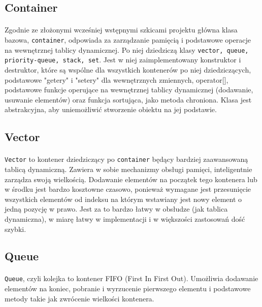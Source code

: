\documentclass{article}
\begin{document}
\subsection{Container}
\paragraph{}
Zgodnie ze złożonymi wcześniej wstępnymi szkicami projektu główna klasa bazowa, \texttt{container}, odpowiada za
zarządzanie pamięcią i podstawowe operacje na wewnętrznej tablicy dynamicznej. Po niej dziedziczą klasy \texttt{vector, queue,
priority-queue, stack, set}. Jest w niej zaimplementowany konstruktor \newline i destruktor, które są wspólne dla wszystkich
kontenerów po niej dziedziczących, podstawowe "getery" i "setery" dla wewnętrznych zmiennych, operator[],
podstawowe funkcje operujące na wewnętrznej tablicy dynamicznej (dodawanie, usuwanie elementów) oraz funkcja
sortująca, jako metoda chroniona. Klasa jest abstrakcyjna, aby uniemożliwić stworzenie obiektu na jej podstawie.

\subsection{Vector}
\paragraph{}
\texttt{Vector} to kontener dziedziczący po \texttt{container} będący bardziej zaawansowaną tablicą dynamiczną.
Zawiera w sobie mechanizmy obsługi pamięci, inteligentnie zarządza swoją wielkością. Dodawanie elementów
na początek tego kontenera lub w środku jest bardzo kosztowne czasowo, ponieważ wymagane jest przesunięcie
wszystkich elementów od indeksu na którym wstawiany jest nowy element o jedną pozycję w prawo. Jest za to bardzo
łatwy w obsłudze (jak tablica dynamiczna), w miarę łatwy w implementacji i w większości zastosowań dość szybki.

\subsection{Queue}
\paragraph{}
\texttt{Queue}, czyli kolejka to kontener FIFO (First In First Out). Umożliwia dodawanie elementów na koniec,
pobranie i wyrzucenie pierwszego elementu i podstawowe metody takie jak zwrócenie wielkości kontenera.
\end{document}
